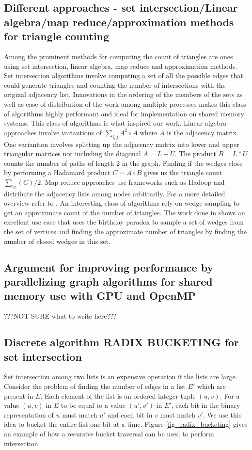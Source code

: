 \documentclass[conference]{IEEEtran}
\begin{document}
\subsection{Different approaches - set intersection/Linear algebra/map reduce/approximation methods for triangle counting}
Among the prominent methods for computing the count of triangles are ones using set intersection, linear algebra, map reduce and approximation methods. Set intersection algorithms \cite{b7} involve computing a set of all the possible edges that could generate triangles and counting the number of intersections with the original adjacency list. Innovations in the ordering of the members of the sets as well as ease of distribution of the work among multiple processes makes this class of algorithms highly performant\cite{b8} and ideal for implementation on shared memory systems. This class of algorithms is what inspired our work. Linear algebra approaches involve variantions of $\sum_{i,j}A^2\circ A$ where $A$ is the adjacency matrix\cite{b6}. One variantion involves splitting up the adjacency matrix into lower and upper triangular matrices not including the diagonal $A = L + U$. The product $B = L*U$ counts the number of paths of length 2 in the graph. Finding if the wedges close by performing a Hadamard product $C= A\circ B$ gives us the triangle count $\sum_{ij}(C)/2$\cite{b10, b9}. Map reduce approaches use frameworks such as Hadoop and distribute the adjacency lists among nodes arbitrarily. For a more detailed overview refer to \cite{b11,b12}. An interesting class of algorithms rely on wedge sampling to get an approximate count of the number of triangles. The work done in \cite{b13} shows an excellent use case that uses the birthday paradox to sample a set of wedges from the set of vertices and finding the approximate number of triangles by finding the number of closed wedges in this set.

\subsection{Argument for improving performance by parallelizing graph algorithms for shared memory use with GPU and OpenMP}
???NOT SURE what to write here???

\subsection{Discrete algorithm RADIX BUCKETING for set intersection}
Set intersection among two lists is an expensive operation if the lists are large. Consider the problem of finding the number of edges in a list $E'$ which are present in $E$. Each element of the list is an ordered integer tuple $(u,v)$. For a value $(u,v)$ in $E$ to be equal to a value $(u',v')$ in $E'$, each bit in the binary representation of $u$ must match $u'$ and each bit in $v$ must match $v'$. We use this idea to bucket the entire list one bit at a time. Figure \ref{fig_radix_bucketing} gives an example of how a recursive bucket traversal can be used to perform intersection.
\end{document}
